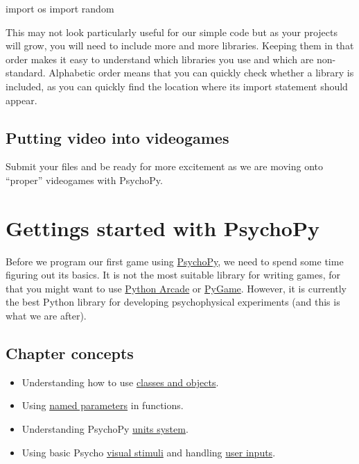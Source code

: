 \documentclass[
]{book}
\newenvironment{Shaded}{\begin{snugshade}}{\end{snugshade}}
\newcommand{\ImportTok}[1]{#1}
\newcommand{\NormalTok}[1]{#1}
\providecommand{\tightlist}{%
  \setlength{\itemsep}{0pt}\setlength{\parskip}{0pt}}
\begin{document}
\begin{Shaded}
\begin{Highlighting}[]
\ImportTok{import}\NormalTok{ os}
\ImportTok{import}\NormalTok{ random}
\end{Highlighting}
\end{Shaded}

This may not look particularly useful for our simple code but as your projects will grow, you will need to include more and more libraries. Keeping them in that order makes it easy to understand which libraries you use and which are non-standard. Alphabetic order means that you can quickly check whether a library is included, as you can quickly find the location where its import statement should appear.

\hypertarget{putting-video-into-videogames}{%
\section{Putting video into videogames}\label{putting-video-into-videogames}}

Submit your files and be ready for more excitement as we are moving onto ``proper'' videogames with PsychoPy.

\hypertarget{psychopy-basics}{%
\chapter{Gettings started with PsychoPy}\label{psychopy-basics}}

Before we program our first game using \href{https://psychopy.org/}{PsychoPy}, we need to spend some time figuring out its basics. It is not the most suitable library for writing games, for that you might want to use \href{https://arcade.academy/}{Python Arcade} or \href{https://www.pygame.org/}{PyGame}. However, it is currently the best Python library for developing psychophysical experiments (and this is what we are after).

\hypertarget{chapter-concepts-3}{%
\section{Chapter concepts}\label{chapter-concepts-3}}

\begin{itemize}
\tightlist
\item
  Understanding how to use \protect\hyperlink{classes-and-objects}{classes and objects}.
\item
  Using \protect\hyperlink{arguments-by-position-or-name}{named parameters} in functions.
\item
  Understanding PsychoPy \protect\hyperlink{psychopy-units}{units system}.
\item
  Using basic Psycho \protect\hyperlink{adding-text-message}{visual stimuli} and handling \protect\hyperlink{make-the-square-jump-on-your-command}{user inputs}.
\end{itemize}
\end{document}

